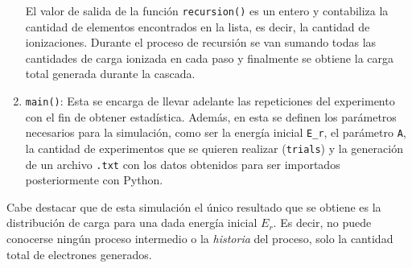 \begin{enumerate}[label=\arabic*., listparindent=1.5em]
    \indent El valor de salida de la función \verb|recursion()| es un entero y contabiliza la cantidad de elementos encontrados en la lista, es decir, la cantidad de ionizaciones. Durante el proceso de recursión se van sumando todas las cantidades de carga ionizada en cada paso y finalmente se obtiene la carga total generada durante la cascada.
    \item \verb|main()|: Esta se encarga de llevar adelante las repeticiones del experimento con el fin de obtener estadística. Además, en esta se definen los parámetros necesarios para la simulación, como ser la energía inicial \verb|E_r|, el parámetro \verb|A|, la cantidad de experimentos que se quieren realizar (\verb|trials|) y la generación de un archivo \verb|.txt| con los datos obtenidos para ser importados posteriormente con Python.
\end{enumerate}
Cabe destacar que de esta simulación el único resultado que se obtiene es la distribución de carga para una dada energía inicial $E_{r}$. Es decir, no puede conocerse ningún proceso intermedio o la \textit{historia} del proceso, solo la cantidad total de electrones generados.